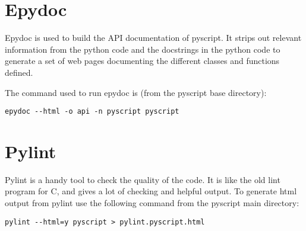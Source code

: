 \documentclass[12pt,a4paper]{article}
\begin{document}
\section{Epydoc}

Epydoc is used to build the API documentation of pyscript.  It strips out
relevant information from the python code and the docstrings in the python
code to generate a set of web pages documenting the different classes and
functions defined.

The command used to run epydoc is (from the pyscript base directory):
\begin{verbatim}
epydoc --html -o api -n pyscript pyscript
\end{verbatim}

\section{Pylint}

Pylint is a handy tool to check the quality of the code.  It is like the old
lint program for C, and gives a lot of checking and helpful output.  To
generate html output from pylint use the following command from the pyscript
main directory:
\begin{verbatim}
pylint --html=y pyscript > pylint.pyscript.html
\end{verbatim}
\end{document}
